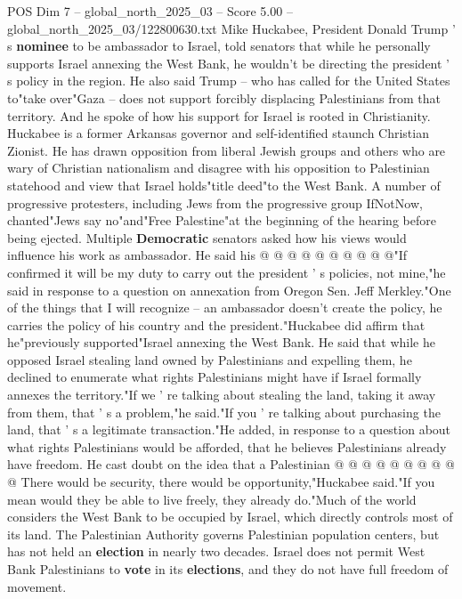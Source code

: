 \begin{textsample}{POS Dim 7 – global\_north\_2025\_03 – Score 5.00 – global\_north\_2025\_03/122800630.txt}  \label{ex:f7_pos_326}
Mike Huckabee, President Donald Trump ' s \textbf{nominee} to be ambassador to Israel, told senators that while he personally supports Israel annexing the West Bank, he wouldn't be directing the president ' s policy in the region.
He also said Trump -- who has called for the United States to"take over"Gaza -- does not support forcibly displacing Palestinians from that territory.
And he spoke of how his support for Israel is rooted in Christianity.
Huckabee is a former Arkansas governor and self-identified staunch Christian Zionist.
He has drawn opposition from liberal Jewish groups and others who are wary of Christian nationalism and disagree with his opposition to Palestinian statehood and view that Israel holds"title deed"to the West Bank.
A number of progressive protesters, including Jews from the progressive group IfNotNow, chanted"Jews say no"and"Free Palestine"at the beginning of the hearing before being ejected.
Multiple \textbf{Democratic} senators asked how his views would influence his work as ambassador.
He said his @ @ @ @ @ @ @ @ @ @"If confirmed it will be my duty to carry out the president ' s policies, not mine,"he said in response to a question on annexation from Oregon Sen.
Jeff Merkley."One of the things that I will recognize -- an ambassador doesn't create the policy, he carries the policy of his country and the president."Huckabee did affirm that he"previously supported"Israel annexing the West Bank.
He said that while he opposed Israel stealing land owned by Palestinians and expelling them, he declined to enumerate what rights Palestinians might have if Israel formally annexes the territory."If we ' re talking about stealing the land, taking it away from them, that ' s a problem,"he said."If you ' re talking about purchasing the land, that ' s a legitimate transaction."He added, in response to a question about what rights Palestinians would be afforded, that he believes Palestinians already have freedom.
He cast doubt on the idea that a Palestinian @ @ @ @ @ @ @ @ @ @ There would be security, there would be opportunity,"Huckabee said."If you mean would they be able to live freely, they already do."Much of the world considers the West Bank to be occupied by Israel, which directly controls most of its land.
The Palestinian Authority governs Palestinian population centers, but has not held an \textbf{election} in nearly two decades.
Israel does not permit West Bank Palestinians to \textbf{vote} in its \textbf{elections}, and they do not have full freedom of movement.

\end{textsample}
